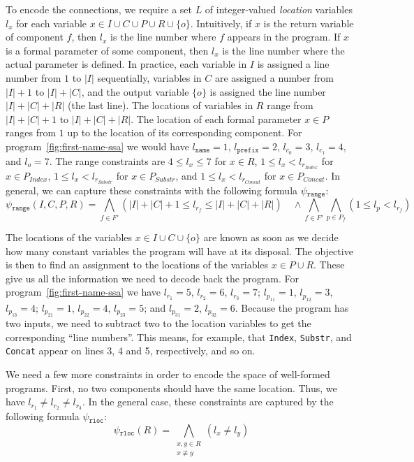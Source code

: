 To encode the connections, we require a set $L$ of integer-valued
\textit{location} variables $l_x$ for each variable $x \in I \cup C \cup P \cup
R \cup \{o\}$. Intuitively, if $x$ is the return variable of component $f$, then
$l_x$ is the line number where $f$ appears in the program. If $x$ is a formal
parameter of some component, then $l_x$ is the line number where the actual
parameter is defined. In practice, each variable in $I$ is assigned a line
number from $1$ to $|I|$ sequentially, variables in $C$ are assigned
a number from $|I| + 1$ to $|I| + |C|$, and the output variable $\{o\}$ is assigned the
line number $|I| + |C| + |R|$ (the last line). The locations of variables in $R$
range from $|I| + |C| + 1$ to $|I| + |C| + |R|$. The location of each formal
parameter $x \in P$ ranges from $1$ up to the location of its corresponding
component.
For program~\ref{fig:first-name-ssa} we would have
$l_{\mathtt{name}} = 1$, $l_{\mathtt{prefix}} = 2$,
$l_{c_0} = 3$, $l_{c_1} = 4$,
and $l_o = 7$.
The range constraints are
$4 \leq l_x \leq 7$ for $x \in R$,
$1 \leq l_x < l_{r_{Index}}$ for $x \in P_{Index}$,
$1 \leq l_x < l_{r_{Substr}}$ for $x \in P_{Substr}$, and
$1 \leq l_x < l_{r_{Concat}}$ for $x \in P_{Concat}$.
In general, we can capture these constraints with the following formula
$\psi{}_{\mathtt{range}}$:
%
\[
  \psi{}_{\mathtt{range}}(I, C, P, R) =
  \bigwedge_{f \in F'} (|I| + |C| + 1 \leq l_{r_f} \leq |I| + |C| + |R|)
  \quad \wedge
  \bigwedge_{f \in F'}
  \bigwedge_{p \in P_f} (1 \leq l_p < l_{r_f})
\]

The locations of the variables $x \in I \cup C \cup \{o\}$ are known as soon as
we decide how many constant variables the program will have at its disposal. The
objective is then to find an assignment to the locations of the variables $x \in
P \cup R$. These give us all the information we need to decode back the program.
For program~\ref{fig:first-name-ssa} we have
$l_{r_1} = 5$, $l_{r_2} = 6$, $l_{r_3} = 7$; $l_{p_{11}} = 1$, $l_{p_{12}} = 3$,
$l_{p_{13}} = 4$; $l_{p_{21}} = 1$, $l_{p_{22}} = 4$, $l_{p_{23}} = 5$; and
$l_{p_{31}} = 2$, $l_{p_{32}} = 6$. Because the program has two inputs, we need
to subtract two to the location variables to get the corresponding ``line
numbers''. This means, for example, that \lstinline{Index}, \lstinline{Substr},
and \lstinline{Concat} appear on lines 3, 4 and 5, respectively, and so on.

We need a few more constraints in order to encode the space of well-formed
programs. First, no two components should have the same location. Thus,
we have $l_{r_1} \neq l_{r_2} \neq l_{r_3}$. In the general case, these
constraints are captured by the following formula $\psi{}_{\mathtt{rloc}}$:
%
\[
  \psi{}_{\mathtt{rloc}}(R) =
  \bigwedge_{\substack{x, y \in R\\ x \not\equiv y}} (l_{x} \neq l_{y}) 
\]


